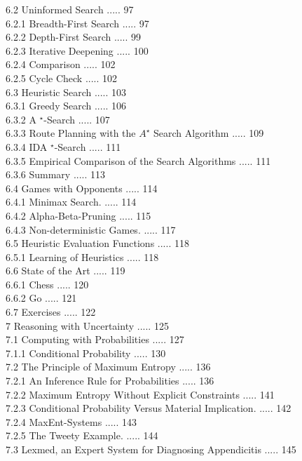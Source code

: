 \documentclass[10pt]{article}
\begin{document}
6.2 Uninformed Search ..... 97\\
6.2.1 Breadth-First Search ..... 97\\
6.2.2 Depth-First Search ..... 99\\
6.2.3 Iterative Deepening ..... 100\\
6.2.4 Comparison ..... 102\\
6.2.5 Cycle Check ..... 102\\
6.3 Heuristic Search ..... 103\\
6.3.1 Greedy Search ..... 106\\
6.3.2 A ${ }^{\star}$-Search ..... 107\\
6.3.3 Route Planning with the $A^{\star}$ Search Algorithm ..... 109\\
6.3.4 IDA ${ }^{\star}$-Search ..... 111\\
6.3.5 Empirical Comparison of the Search Algorithms ..... 111\\
6.3.6 Summary ..... 113\\
6.4 Games with Opponents ..... 114\\
6.4.1 Minimax Search. ..... 114\\
6.4.2 Alpha-Beta-Pruning ..... 115\\
6.4.3 Non-deterministic Games. ..... 117\\
6.5 Heuristic Evaluation Functions ..... 118\\
6.5.1 Learning of Heuristics ..... 118\\
6.6 State of the Art ..... 119\\
6.6.1 Chess ..... 120\\
6.6.2 Go ..... 121\\
6.7 Exercises ..... 122\\
7 Reasoning with Uncertainty ..... 125\\
7.1 Computing with Probabilities ..... 127\\
7.1.1 Conditional Probability ..... 130\\
7.2 The Principle of Maximum Entropy ..... 136\\
7.2.1 An Inference Rule for Probabilities ..... 136\\
7.2.2 Maximum Entropy Without Explicit Constraints ..... 141\\
7.2.3 Conditional Probability Versus Material Implication. ..... 142\\
7.2.4 MaxEnt-Systems ..... 143\\
7.2.5 The Tweety Example. ..... 144\\
7.3 Lexmed, an Expert System for Diagnosing Appendicitis ..... 145\\
\end{document}
